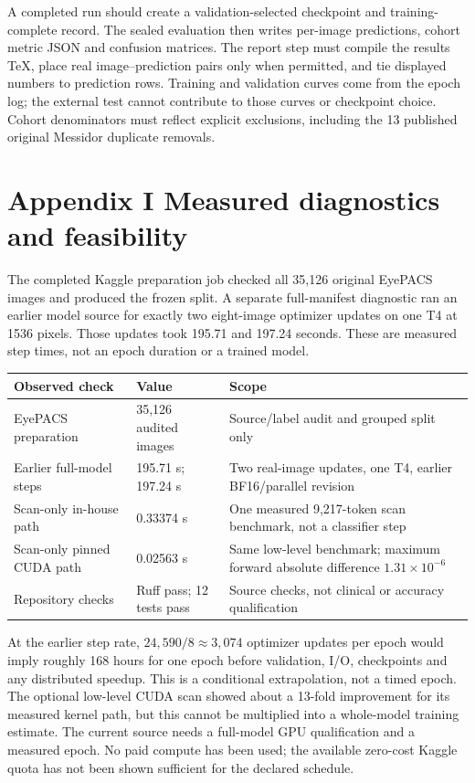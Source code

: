 A completed run should create a validation-selected checkpoint and
training-complete record. The sealed evaluation then writes per-image
predictions, cohort metric JSON and confusion matrices. The report step
must compile the results TeX, place real image--prediction pairs only
when permitted, and tie displayed numbers to prediction rows. Training
and validation curves come from the epoch log; the external test cannot
contribute to those curves or checkpoint choice. Cohort denominators
must reflect explicit exclusions, including the 13 published original
Messidor duplicate removals.

\newpage
\section*{\color{ink}Appendix I \quad Measured diagnostics and feasibility}
The completed Kaggle preparation job checked all 35,126 original EyePACS
images and produced the frozen split. A separate full-manifest diagnostic
ran an earlier model source for exactly two eight-image optimizer updates
on one T4 at 1536 pixels. Those updates took 195.71 and 197.24 seconds.
These are measured step times, not an epoch duration or a trained model.

\small
\begin{tabularx}{\linewidth}{@{}p{.32\linewidth}p{.22\linewidth}Y@{}}
\toprule
Observed check & Value & Scope\\
\midrule
EyePACS preparation & 35,126 audited images & Source/label audit and
grouped split only\\
Earlier full-model steps & 195.71 s; 197.24 s & Two real-image updates,
one T4, earlier BF16/parallel revision\\
Scan-only in-house path & 0.33374 s & One measured 9,217-token scan
benchmark, not a classifier step\\
Scan-only pinned CUDA path & 0.02563 s & Same low-level benchmark;
maximum forward absolute difference $1.31\times10^{-6}$\\
Repository checks & Ruff pass; 12 tests pass & Source checks, not
clinical or accuracy qualification\\
\bottomrule
\end{tabularx}
\normalsize

At the earlier step rate, $24{,}590/8\approx3{,}074$ optimizer updates
per epoch would imply roughly 168 hours for one epoch before validation,
I/O, checkpoints and any distributed speedup. This is a conditional
extrapolation, not a timed epoch. The optional low-level CUDA scan showed
about a 13-fold improvement for its measured kernel path, but this cannot
be multiplied into a whole-model training estimate. The current source
needs a full-model GPU qualification and a measured epoch. No paid
compute has been used; the available zero-cost Kaggle quota has not
been shown sufficient for the declared schedule.

